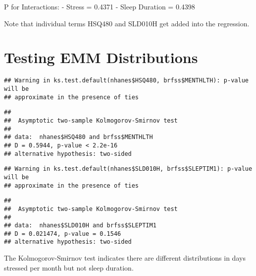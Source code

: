 \documentclass[
]{article}
\newenvironment{Shaded}{\begin{snugshade}}{\end{snugshade}}
\newcommand{\FunctionTok}[1]{\textcolor[rgb]{0.13,0.29,0.53}{\textbf{#1}}}
\newcommand{\NormalTok}[1]{#1}
\newcommand{\SpecialCharTok}[1]{\textcolor[rgb]{0.81,0.36,0.00}{\textbf{#1}}}
\begin{document}
P for Interactions: - Stress = 0.4371 - Sleep Duration = 0.4398

Note that individual terms HSQ480 and SLD010H get added into the
regression.

\section{Testing EMM Distributions}\label{testing-emm-distributions}

\begin{Shaded}
\end{Shaded}

\begin{verbatim}
## Warning in ks.test.default(nhanes$HSQ480, brfss$MENTHLTH): p-value will be
## approximate in the presence of ties
\end{verbatim}

\begin{verbatim}
## 
##  Asymptotic two-sample Kolmogorov-Smirnov test
## 
## data:  nhanes$HSQ480 and brfss$MENTHLTH
## D = 0.5944, p-value < 2.2e-16
## alternative hypothesis: two-sided
\end{verbatim}

\begin{Shaded}
\end{Shaded}

\begin{verbatim}
## Warning in ks.test.default(nhanes$SLD010H, brfss$SLEPTIM1): p-value will be
## approximate in the presence of ties
\end{verbatim}

\begin{verbatim}
## 
##  Asymptotic two-sample Kolmogorov-Smirnov test
## 
## data:  nhanes$SLD010H and brfss$SLEPTIM1
## D = 0.021474, p-value = 0.1546
## alternative hypothesis: two-sided
\end{verbatim}

The Kolmogorov-Smirnov test indicates there are different distributions
in days stressed per month but not sleep duration.
\end{document}
